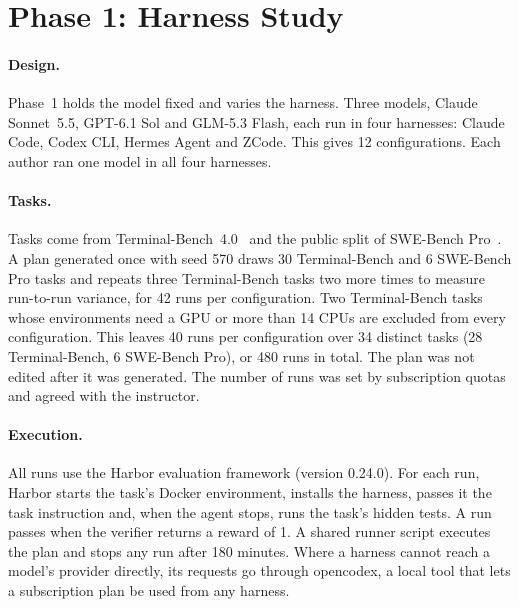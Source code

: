\section{Phase 1: Harness Study}
\label{sec:p1method}

\paragraph{Design.}
Phase~1 holds the model fixed and varies the harness. Three models, Claude Sonnet~5.5, GPT-6.1 Sol and
GLM-5.3 Flash, each run in four harnesses: Claude Code, Codex CLI, Hermes Agent and ZCode. This gives 12
configurations. Each author ran one model in all four harnesses.

\paragraph{Tasks.}
Tasks come from Terminal-Bench~4.0~\cite{tb4} and the public split of SWE-Bench Pro~\cite{deng2025sweprobench}.
A plan generated once with seed 570 draws 30 Terminal-Bench and 6 SWE-Bench Pro tasks and repeats three
Terminal-Bench tasks two more times to measure run-to-run variance, for 42 runs per configuration. Two
Terminal-Bench tasks whose environments need a GPU or more than 14 CPUs are excluded from every configuration.
This leaves 40 runs per configuration over 34 distinct tasks (28 Terminal-Bench, 6 SWE-Bench Pro), or 480 runs
in total. The plan was not edited after it was generated. The number of runs was set by subscription quotas and
agreed with the instructor.

\paragraph{Execution.}
All runs use the Harbor evaluation framework (version 0.24.0). For each run, Harbor starts the task's Docker
environment, installs the harness, passes it the task instruction and, when the agent stops, runs the task's
hidden tests. A run passes when the verifier returns a reward of 1. A shared runner script executes the plan and
stops any run after 180 minutes. Where a harness cannot reach a model's provider directly, its requests go
through opencodex, a local tool that lets a subscription plan be used from any harness.

